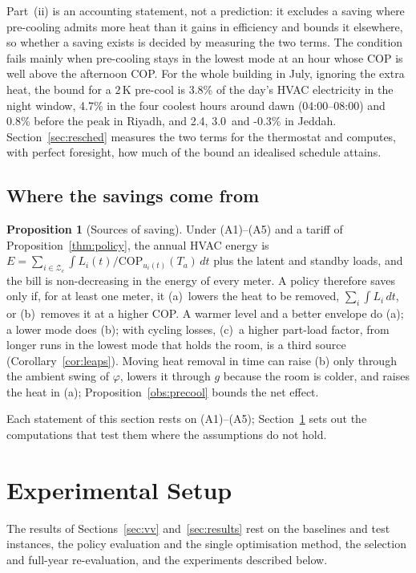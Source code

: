 \documentclass[10pt,a4paper,twocolumn]{article}
\theoremstyle{definition}
\newtheorem{proposition}{Proposition}
\newcommand{\hlBoundNight}{3.8}
\newcommand{\hlBoundPeak}{0.8}
\newcommand{\hlBoundDawn}{4.7}
\newcommand{\hlBoundNightJ}{2.4}
\newcommand{\hlBoundDawnJ}{3.0}
\newcommand{\hlBoundPeakJ}{-0.3}
\begin{document}
Part~(ii) is an accounting statement, not a prediction: it excludes a saving where pre-cooling admits more heat than it gains in efficiency and bounds it elsewhere, so whether a saving exists is decided by measuring the two terms. The condition fails mainly when pre-cooling stays in the lowest mode at an hour whose COP is well above the afternoon COP. For the whole building in July, ignoring the extra heat, the bound for a $2\,$K pre-cool is \hlBoundNight\% of the day's HVAC electricity in the night window, \hlBoundDawn\% in the four coolest hours around dawn (04:00--08:00) and \hlBoundPeak\% before the peak in Riyadh, and \hlBoundNightJ, \hlBoundDawnJ\ and \hlBoundPeakJ\% in Jeddah. Section~\ref{sec:resched} measures the two terms for the thermostat and computes, with perfect foresight, how much of the bound an idealised schedule attains.

\subsection{Where the savings come from}\label{sec:savingsource}
\begin{proposition}[Sources of saving]\label{prop:sources}
Under (A1)--(A5) and a tariff of Proposition~\ref{thm:policy}, the annual HVAC energy is $E=\sum_{i\in\mathcal{Z}_c}\int L_i(t)/\mathrm{COP}_{u_i(t)}(T_a)\,dt$ plus the latent and standby loads, and the bill is non-decreasing in the energy of every meter. A policy therefore saves only if, for at least one meter, it (a)~lowers the heat to be removed, $\sum_i\int L_i\,dt$, or (b)~removes it at a higher COP. A warmer level and a better envelope do (a); a lower mode does (b); with cycling losses, (c)~a higher part-load factor, from longer runs in the lowest mode that holds the room, is a third source (Corollary~\ref{cor:leaps}). Moving heat removal in time can raise (b) only through the ambient swing of $\varphi$, lowers it through $g$ because the room is colder, and raises the heat in (a); Proposition~\ref{obs:precool} bounds the net effect.
\end{proposition}
Each statement of this section rests on (A1)--(A5); Section~\ref{sec:setup} sets out the computations that test them where the assumptions do not hold.
\section{Experimental Setup}\label{sec:setup}\label{sec:method}
The results of Sections~\ref{sec:vv} and~\ref{sec:results} rest on the baselines and test instances, the policy evaluation and the single optimisation method, the selection and full-year re-evaluation, and the experiments described below.
\end{document}
